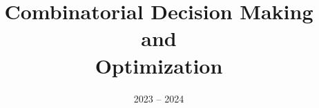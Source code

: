 \documentclass[11pt]{ainotes}
\title{Combinatorial Decision Making\\and\\Optimization}
\date{2023 -- 2024}
\begin{document}
    
    \makenotesfront
    
\end{document}
